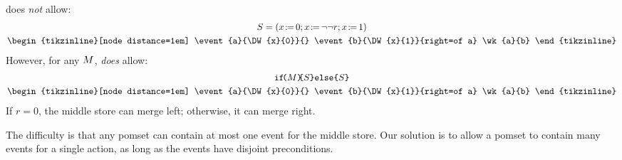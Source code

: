 


\begin{example}
  \label{ex:if1}
   does \emph{not} allow:
  \begin{gather*}
    \aCmd=\PBR{
      \PW{x}{0}\SEMI
      \PW{x}{\BANG\BANG r}\SEMI
      \PW{x}{1}
    }
    \\
    \hbox{\begin{tikzinline}[node distance=1em]
        \event{a}{\DW{x}{0}}{}
        \event{b}{\DW{x}{1}}{right=of a}
        \wk{a}{b}
      \end{tikzinline}}
  \end{gather*}
  However, for any $M$,  \emph{does} allow:
  \begin{gather*}
    \IF{\aExp}\THEN\aCmd\ELSE\aCmd\FI
    \\
    \hbox{\begin{tikzinline}[node distance=1em]
        \event{a}{\DW{x}{0}}{}
        \event{b}{\DW{x}{1}}{right=of a}
        \wk{a}{b}
      \end{tikzinline}}
  \end{gather*}
  If $r=0$, the middle store can merge left; otherwise, it can merge right.
\end{example}

The difficulty is that any pomset can contain at most one event for the
middle store.  Our solution is to allow a pomset to contain many events for a
single action, as long as the events have disjoint preconditions.

